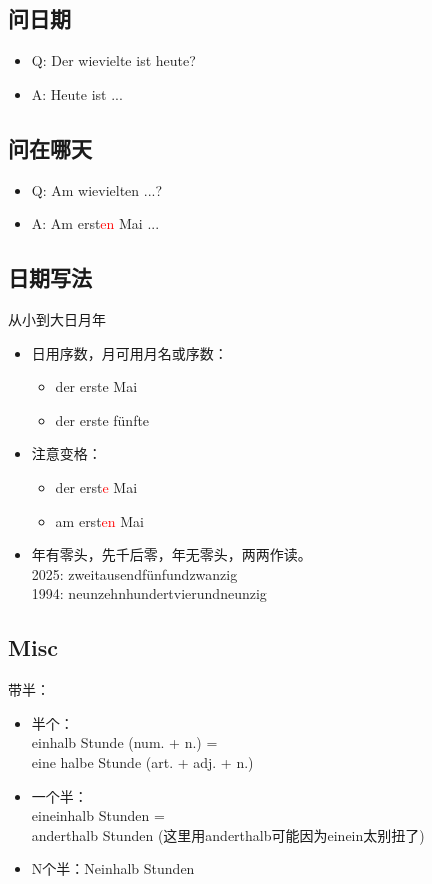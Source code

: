 \subsection{问日期}
\begin{itemize}
    \item Q: Der wievielte ist heute?
    \item A: Heute ist ...
\end{itemize}

\subsection{问在哪天}
\begin{itemize}
    \item Q: Am wievielten ...?
    \item A: Am erst\textcolor{red}{en} Mai ...
\end{itemize}

\subsection{日期写法}
从小到大日月年 \\
\begin{itemize}
    \item 日用序数，月可用月名或序数：
          \begin{itemize}
              \item der erste Mai
              \item der erste fünfte
          \end{itemize}
    \item 注意变格：\\
          \begin{itemize}
              \item der erst\textcolor{red}{e} Mai \sqr[border=true]
              \item am erst\textcolor{red}{en} Mai \olive[border=true]
          \end{itemize}
    \item 年有零头，先千后零，年无零头，两两作读。\\
    2025: zweitausendfünfundzwanzig \\
    1994: neunzehnhundertvierundneunzig \\
\end{itemize}

\subsection{Misc}
带半：
\begin{itemize}
    \item 半个： \\
          einhalb Stunde (num. + n.) =  \\
          eine halbe Stunde (art. + adj. + n.)
    \item 一个半： \\
          eineinhalb Stunden = \\
          anderthalb Stunden (这里用anderthalb可能因为einein太别扭了) \\
    \item N个半：Neinhalb Stunden
\end{itemize}